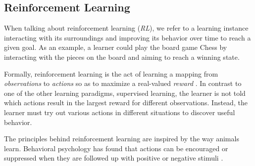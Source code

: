 \subsection{Reinforcement Learning}
When talking about reinforcement learning (\textit{RL}), we refer to a learning instance interacting with its surroundings and improving its behavior over time to reach a given goal. As an example, a learner could play the board game Chess by interacting with the pieces on the board and aiming to reach a winning state.

Formally, reinforcement learning is the act of learning a mapping from \textit{observations} to \textit{actions} so as to maximize a real-valued \textit{reward} \cite{bible}. In contrast to one of the other learning paradigms, supervised learning, the learner is not told which actions result in the largest reward for different observations. Instead, the learner must try out various actions in different situations to discover useful behavior.

The principles behind reinforcement learning are inspired by the way animals learn. Behavioral psychology has found that actions can be encouraged or suppressed when they are followed up with positive or negative stimuli \cite{thorndike}.





